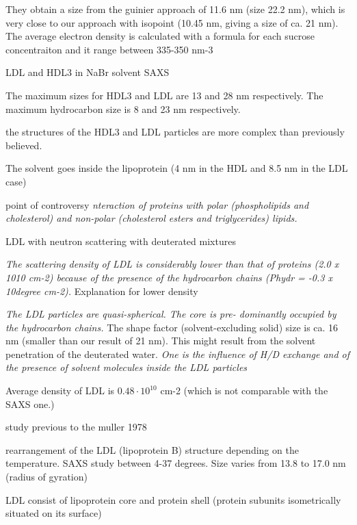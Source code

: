They obtain a size from the guinier approach of 11.6 nm (size 22.2 nm), which is very close to our approach with isopoint (10.45 nm, giving a size of ca. 21 nm). The average electron density is calculated with a formula for each sucrose concentraiton and it range between 335-350 nm-3

\cite{tardieu_structure_1976}

LDL and HDL3 in NaBr solvent SAXS

The maximum sizes for HDL3 and LDL are 13 and 28 nm respectively. The maximum hydrocarbon size is 8 and 23 nm respectively.

the structures of the HDL3 and LDL particles are more complex than previously believed.

The solvent goes inside the lipoprotein (4 nm in the HDL and 8.5 nm in the LDL case)

point of controversy \emph{nteraction of proteins with polar (phospholipids and cholesterol) and non-polar (cholesterol esters and triglycerides) lipids. }
 
\cite{stuhrmann_neutron_1975}

LDL with neutron scattering with deuterated mixtures

\emph{The scattering density of LDL is considerably lower than that of proteins (2.0 x 1010 cm-2) because of the presence of the hydrocarbon chains (Phydr = -0.3 x 10degree cm-2).} Explanation for lower density

\emph{The LDL particles are quasi-spherical. The core is pre- dominantly occupied by the hydrocarbon chains.} The shape factor (solvent-excluding solid) size is ca. 16 nm (smaller than our result of 21 nm). This might result from the solvent penetration of the deuterated water. \emph{One is the influence of H/D exchange and of the presence of solvent molecules inside the LDL particles}

Average density of LDL is $0.48\cdot10^10$ cm-2 (which is not comparable with the SAXS one.)


\cite{laggner_molecular_1977}
study previous to the muller 1978

rearrangement of the LDL (lipoprotein B) structure depending on the temperature. SAXS study between 4-37 degrees. Size varies from 13.8 to 17.0 nm (radius of gyration)


\cite{luzzati_structure_1979}

LDL consist of lipoprotein core and protein shell (protein subunits isometrically situated on its surface)


